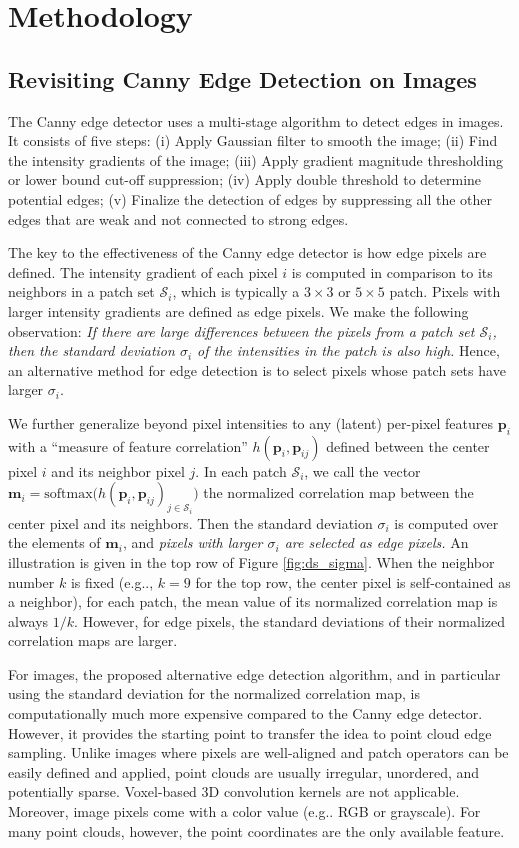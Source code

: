 \documentclass[10pt,twocolumn,letterpaper]{article}
\makeatletter
\newcommand{\bm}{\mathbf{m}}\newcommand{\bM}{\mathbf{M}}
\newcommand{\bp}{\mathbf{p}}\newcommand{\bP}{\mathbf{P}}
\newcommand{\cS}{\mathcal{S}}
\DeclareRobustCommand\onedot{\futurelet\@let@token\@onedot}
\def\@onedot{\ifx\@let@token.\else.\null\fi\xspace}
\def\eg{e.g\onedot} \def\Eg{E.g\onedot}
\makeatother
\begin{document}
\section{Methodology}
\label{sec:method}
\subsection{Revisiting Canny Edge Detection on Images}
The Canny edge detector uses a multi-stage algorithm to detect edges in images. It consists of five steps: (i) Apply Gaussian filter to smooth the image; (ii) Find the intensity gradients of the image; (iii) Apply gradient magnitude thresholding or lower bound cut-off suppression; (iv) Apply double threshold to determine potential edges; (v) Finalize the detection of edges by suppressing all the other edges that are weak and not connected to strong edges. 

The key to the effectiveness of the Canny edge detector is how edge pixels are defined. 
The intensity gradient of each pixel $i$ is computed in comparison to its neighbors in a patch set $\cS_i$, which is typically a $3 \times 3$ or $5 \times 5$ patch. Pixels with larger intensity gradients are defined as edge pixels. We make the following observation: 
\emph{If there are large differences between the pixels from a patch set $\cS_i$, then the standard deviation $\sigma_i$ of the intensities in the patch is also high.}
Hence, an alternative method for edge detection is to select pixels whose patch sets have larger $\sigma_i$.

We further generalize beyond pixel intensities to any (latent) per-pixel features $\bp_i$ with a \enquote{measure of feature correlation} $h(\bp_i, \bp_{ij})$ defined between the center pixel $i$ and its neighbor pixel $j$. 
In each patch $\cS_i$, we call the vector $\bm_i = \mathrm{softmax}\big(h(\bp_i, \bp_{ij})_{j\in \cS_i}\big)$ the normalized correlation map between the center pixel and its neighbors.
Then the standard deviation $\sigma_i$ is computed over the elements of $\bm_i$, and \emph{pixels with larger $\sigma_i$ are selected as edge pixels.}
An illustration is given in the top row of Figure \ref{fig:ds_sigma}. When the neighbor number $k$ is fixed (\eg, $k=9$ for the top row, the center pixel is self-contained as a neighbor), for each patch, the mean value of its normalized correlation map is always $1/k$. However, for edge pixels, the standard deviations of their normalized correlation maps are larger.

For images, the proposed alternative edge detection algorithm, and in particular using the standard deviation for the normalized correlation map, is computationally much more expensive compared to the Canny edge detector. However, it provides the starting point to transfer the idea to point cloud edge sampling.
Unlike images where pixels are well-aligned and patch operators can be easily defined and applied, point clouds are usually irregular, unordered, and potentially sparse. Voxel-based 3D convolution kernels are not applicable. Moreover, image pixels come with a color value (\eg RGB or grayscale). For many point clouds, however, the point coordinates are the only available feature.
\end{document}
